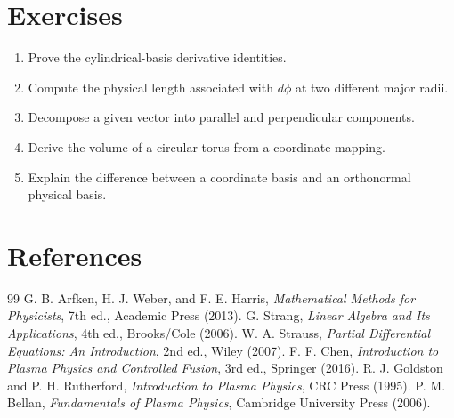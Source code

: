 \documentclass[11pt]{article}
\begin{document}
\section{Exercises}
\begin{enumerate}[leftmargin=1.8em]
\item Prove the cylindrical-basis derivative identities.
\item Compute the physical length associated with $d\phi$ at two different major radii.
\item Decompose a given vector into parallel and perpendicular components.
\item Derive the volume of a circular torus from a coordinate mapping.
\item Explain the difference between a coordinate basis and an orthonormal physical basis.
\end{enumerate}

\section{References}
\begin{thebibliography}{99}
 G. B. Arfken, H. J. Weber, and F. E. Harris, \emph{Mathematical Methods for Physicists}, 7th ed., Academic Press (2013).
 G. Strang, \emph{Linear Algebra and Its Applications}, 4th ed., Brooks/Cole (2006).
 W. A. Strauss, \emph{Partial Differential Equations: An Introduction}, 2nd ed., Wiley (2007).
 F. F. Chen, \emph{Introduction to Plasma Physics and Controlled Fusion}, 3rd ed., Springer (2016).
 R. J. Goldston and P. H. Rutherford, \emph{Introduction to Plasma Physics}, CRC Press (1995).
 P. M. Bellan, \emph{Fundamentals of Plasma Physics}, Cambridge University Press (2006).
\end{thebibliography}
\end{document}
